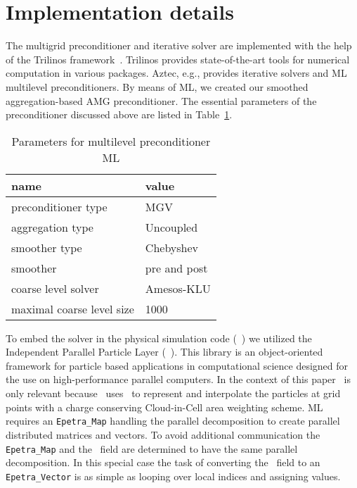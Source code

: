 \section{Implementation details}
\label{sec:impl}

The multigrid preconditioner and iterative solver are implemented with
the help of the Trilinos framework~\cite{Trilinos-Web-Site,
  Trilinos-TOMS}.  Trilinos provides state-of-the-art tools for
numerical computation in various packages.  Aztec, e.g., provides
iterative solvers and ML~\cite{gsht:06} multilevel preconditioners.  By
means of ML, we created our smoothed aggregation-based AMG
preconditioner.  The essential parameters of the preconditioner
discussed above are listed in Table~\ref{tab:sa_setup}.
\begin{table}[htb]
  \begin{center}
    \begin{tabular}{l|l}
      \hline
      name & value \\
      \hline
      preconditioner type & MGV \\
      aggregation type & Uncoupled \\
      smoother type & Chebyshev \\
      smoother & pre and post \\
      coarse level solver & Amesos-KLU \\
      maximal coarse level size & 1000 \\
      \hline
    \end{tabular}
    \caption{Parameters for multilevel
      preconditioner ML}
    \label{tab:sa_setup}
  \end{center}
\end{table}

To embed the solver in the physical simulation code (\opal~\cite{opal})
we utilized the Independent Parallel Particle Layer (\ippl~\cite{ippl}).
This library is an object-oriented framework for particle based
applications in computational science designed for the use on
high-performance parallel computers.  In the context of this paper
\ippl\ is only relevant because \opal\ uses \ippl\ to represent and
interpolate the particles at grid points with a charge conserving
Cloud-in-Cell area weighting scheme.  ML requires an
\texttt{Epetra\_Map} handling the parallel decomposition to create
parallel distributed matrices and vectors. To avoid additional
communication the \texttt{Epetra\_Map} and the \ippl\ field are determined
to have the same parallel decomposition. In this special case the task
of converting the \ippl\ field to an \texttt{Epetra\_Vector} is as
simple as looping over local indices and assigning values.  

